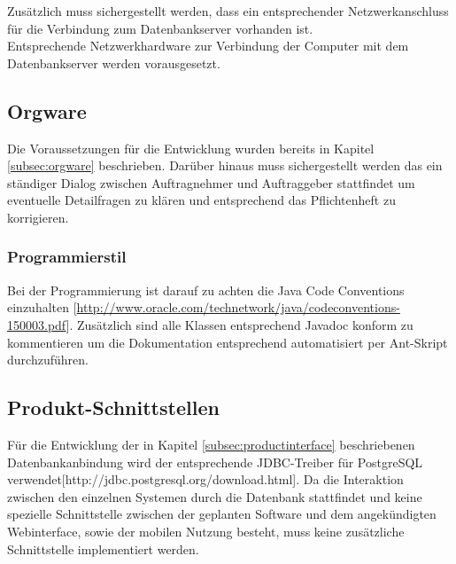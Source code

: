 Zusätzlich muss sichergestellt werden, dass ein entsprechender Netzwerkanschluss für die Verbindung zum Datenbankserver vorhanden ist.\\

Entsprechende Netzwerkhardware zur Verbindung der Computer mit dem Datenbankserver werden vorausgesetzt.\\

\subsection{Orgware}
\label{subsec:devorgware}

Die Voraussetzungen für die Entwicklung wurden bereits in Kapitel \ref{subsec:orgware} beschrieben.
Darüber hinaus muss sichergestellt werden das ein ständiger Dialog zwischen Auftragnehmer und Auftraggeber stattfindet um eventuelle Detailfragen zu klären und entsprechend das Pflichtenheft zu korrigieren.\\

\subsubsection{Programmierstil}

Bei der Programmierung ist darauf zu achten die Java Code Conventions einzuhalten [\url{http://www.oracle.com/technetwork/java/codeconventions-150003.pdf}].
Zusätzlich sind alle Klassen entsprechend Javadoc konform zu kommentieren um die Dokumentation entsprechend automatisiert per Ant-Skript durchzuführen.

\subsection{Produkt-Schnittstellen}

Für die Entwicklung der in Kapitel \ref{subsec:productinterface} beschriebenen Datenbankanbindung wird der entsprechende JDBC-Treiber für PostgreSQL verwendet[http://jdbc.postgresql.org/download.html].
Da die Interaktion zwischen den einzelnen Systemen durch die Datenbank stattfindet und keine spezielle Schnittstelle zwischen der geplanten Software und dem angekündigten Webinterface, sowie der mobilen Nutzung besteht, muss keine zusätzliche Schnittstelle implementiert werden.\\